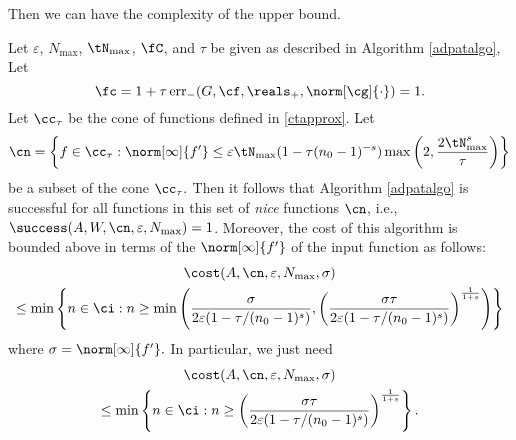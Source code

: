 Then we can have the complexity of the upper bound.
\begin{theorem}   Let  $\varepsilon$, $N_{\max}$, $\tN_{\max}$, $\fC$, and $\tau$ be given as described in Algorithm \ref{adpatalgo},  Let
$$
\fc =1 + \tau \err_{-}(G,\cf,\reals_+,\norm[\cg]{\cdot}) =1.
$$
Let $\cc_\tau$ be the cone of functions defined in \eqref{ctapprox}.  Let
\begin{equation} \label{nicefdef}
\cn = \left \{ f \in \cc_\tau : \norm[\infty]{f'} \le \varepsilon \tN_{\max}(1 - \tau (n_0-1)^{-s}) \max\left( 2, \frac{2\tN_{\max}^{s}}{\tau} \right ) \right\}
\end{equation}
be a subset of the cone $\cc_\tau.$  Then it follows that Algorithm \ref{adpatalgo} is successful for all functions in this set of \emph{nice} functions $\cn$,  i.e.,  $\success(A,W,\cn,\varepsilon,N_{\max}) = 1$.  Moreover, the cost of this algorithm is bounded above in terms of the $\norm[\infty]{f'}$ of the input function as follows:
\begin{multline}
\cost(A,\cn,\varepsilon,N_{\max},\sigma) \\
\le  \min\left\{ n \in \ci : n \ge \min\left( \frac{\sigma}{2\varepsilon(1 - \tau/(n_{0}-1)^{s})} , \left(\frac{\sigma\tau}{2\varepsilon(1 - \tau/(n_{0}-1)^{s})}\right)^{\frac{1}{1+s}}\right)  \right\}
\end{multline} where $\sigma=\norm[\infty]{f'}.$
In particular, we just need
\begin{multline}
\cost(A,\cn,\varepsilon,N_{\max},\sigma) \\
\le  \min\left\{ n \in \ci : n \ge  \left(\frac{\sigma\tau}{2\varepsilon(1 - \tau/(n_{0}-1)^{s})}\right)^{\frac{1}{1+s}}  \right\}.
\end{multline}


\end{theorem}

